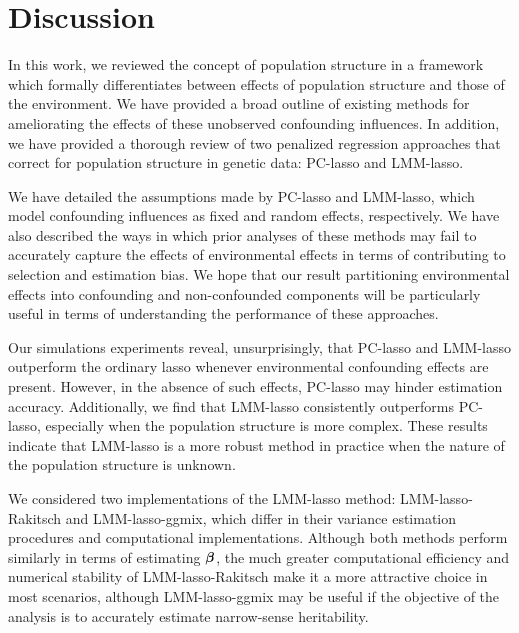 \section{Discussion} \label{sec:discussion}

In this work, we reviewed the concept of population structure in a framework which formally differentiates between effects of population structure and those of the environment. We have provided a broad outline of existing  methods for ameliorating the effects of these unobserved confounding influences. In addition, we have provided a thorough review of two penalized regression approaches that correct for population structure in genetic data: PC-lasso and LMM-lasso. 

We have detailed the assumptions made by PC-lasso and LMM-lasso, which model confounding influences as fixed and random effects, respectively. We have also described the ways in which prior analyses of these methods may fail to accurately capture the effects of environmental effects in terms of contributing to selection and estimation bias. We hope that our result partitioning environmental effects into confounding and non-confounded components will be particularly useful in terms of understanding the performance of these approaches.

Our simulations experiments reveal, unsurprisingly, that PC-lasso and LMM-lasso outperform the ordinary lasso whenever environmental confounding effects are present. However, in the absence of such effects, PC-lasso may hinder estimation accuracy. Additionally, we find that LMM-lasso consistently outperforms PC-lasso, especially when the population structure is more complex. These results indicate that LMM-lasso is a more robust method in practice when the nature of the population structure is unknown.

We considered two implementations of the LMM-lasso method: LMM-lasso-Rakitsch and LMM-lasso-ggmix, which differ in their variance estimation procedures and computational implementations. Although both methods perform similarly in terms of estimating $\boldsymbol{\beta}{}$, the much greater computational efficiency and numerical stability of LMM-lasso-Rakitsch make it a more attractive choice in most scenarios, although LMM-lasso-ggmix may be useful if the objective of the analysis is to accurately estimate narrow-sense heritability.

